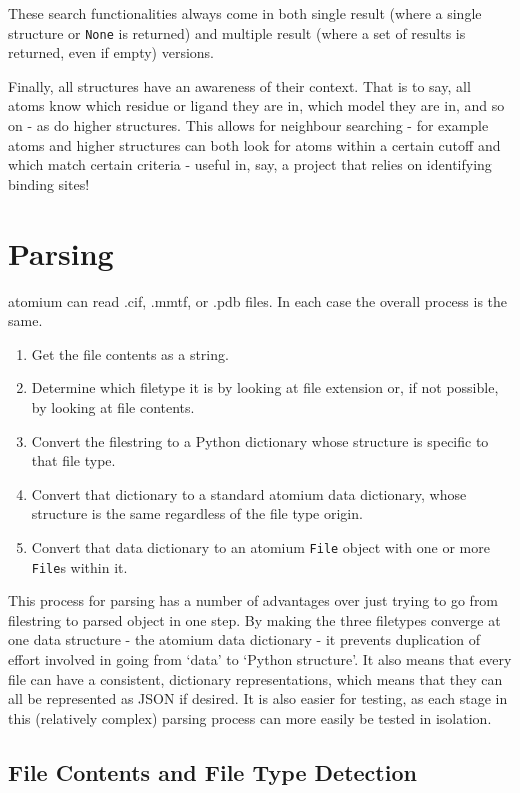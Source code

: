 These search functionalities always come in both single result (where a single structure or \texttt{None} is returned) and multiple result (where a set of results is returned, even if empty) versions.

Finally, all structures have an awareness of their context. That is to say, all atoms know which residue or ligand they are in, which model they are in, and so on - as do higher structures. This allows for neighbour searching - for example atoms and higher structures can both look for atoms within a certain cutoff and which match certain criteria - useful in, say, a project that relies on identifying binding sites!

\section{Parsing}

atomium can read .cif, .mmtf, or .pdb files. In each case the overall process is the same.

\begin{enumerate}
   \item Get the file contents as a string.
   \item Determine which filetype it is by looking at file extension or, if not possible, by looking at file contents.
   \item Convert the filestring to a Python dictionary whose structure is specific to that file type.
   \item Convert that dictionary to a standard atomium data dictionary, whose structure is the same regardless of the file type origin.
   \item Convert that data dictionary to an atomium \texttt{File} object with one or more \texttt{File}s within it.
\end{enumerate}

This process for parsing has a number of advantages over just trying to go from filestring to parsed object in one step. By making the three filetypes converge at one data structure - the atomium data dictionary - it prevents duplication of effort involved in going from `data' to `Python structure'. It also means that every file can have a consistent, dictionary representations, which means that they can all be represented as JSON if desired. It is also easier for testing, as each stage in this (relatively complex) parsing process can more easily be tested in isolation.

\subsection{File Contents and File Type Detection}


